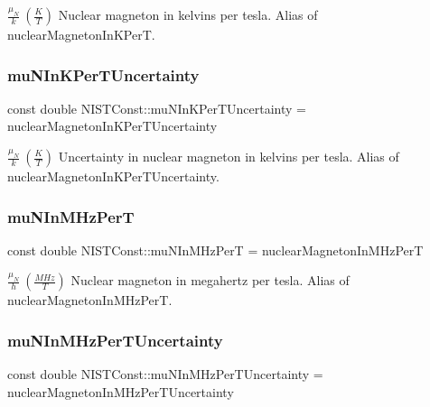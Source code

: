 $\frac{\mu_N}{k} \ (\frac{K}{T})$ Nuclear magneton in kelvins per tesla. Alias of nuclear\+Magneton\+In\+K\+PerT. \mbox{\label{group___n_i_s_t_const-_nuclear_magneton_ga235e592dc664f715a256c4ee49410486}} 
\subsubsection{\texorpdfstring{mu\+N\+In\+K\+Per\+T\+Uncertainty}{muNInKPerTUncertainty}}
{\footnotesize\ttfamily const double N\+I\+S\+T\+Const\+::mu\+N\+In\+K\+Per\+T\+Uncertainty = nuclear\+Magneton\+In\+K\+Per\+T\+Uncertainty}

$\frac{\mu_N}{k} \ (\frac{K}{T})$ Uncertainty in nuclear magneton in kelvins per tesla. Alias of nuclear\+Magneton\+In\+K\+Per\+T\+Uncertainty. \mbox{\label{group___n_i_s_t_const-_nuclear_magneton_ga4c2e37b42112c282a0dc5969f351187e}} 
\subsubsection{\texorpdfstring{mu\+N\+In\+M\+Hz\+PerT}{muNInMHzPerT}}
{\footnotesize\ttfamily const double N\+I\+S\+T\+Const\+::mu\+N\+In\+M\+Hz\+PerT = nuclear\+Magneton\+In\+M\+Hz\+PerT}

$\frac{\mu_N}{h} \ (\frac{MHz}{T})$ Nuclear magneton in megahertz per tesla. Alias of nuclear\+Magneton\+In\+M\+Hz\+PerT. \mbox{\label{group___n_i_s_t_const-_nuclear_magneton_ga5b70d81fc8665de09e33dc709a91e7f9}} 
\subsubsection{\texorpdfstring{mu\+N\+In\+M\+Hz\+Per\+T\+Uncertainty}{muNInMHzPerTUncertainty}}
{\footnotesize\ttfamily const double N\+I\+S\+T\+Const\+::mu\+N\+In\+M\+Hz\+Per\+T\+Uncertainty = nuclear\+Magneton\+In\+M\+Hz\+Per\+T\+Uncertainty}

